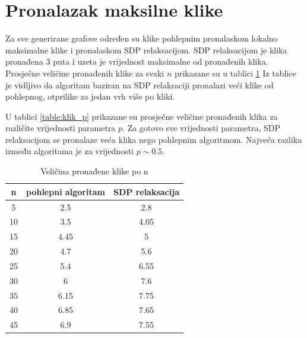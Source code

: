 \documentclass[diplomskirad]{fer}
\begin{document}
\section{Pronalazak maksilne klike}
Za sve generirane grafove određen su klike pohlepnim pronalaskom lokalno maksimalne klike i pronalaskom SDP relaksacijom. SDP relaksacijom je klika pronađena
3 puta i uzeta je vrijednost maksimalne od pronađenih klika. Prosječne veličine pronađenih klike za svaki $n$ prikazane su u tablici \ref{table:klik_n}
Iz tablice je vidljivo da algoritam baziran na SDP relaksaciji pronalazi veći klike od pohlepnog, otprilike za jedan vrh više po kliki.

U tablici \ref{table:klik_p} prikazane su prosječne veličine pronađenih klika za različite vrijednosti parametra $p$. Za gotovo sve vrijednosti
parametra, SDP relaksacijom se pronalaze veća klika nego pohlepnim algoritmom. Najveća razlika između algoritama je za vrijednosti $p \sim 0.5$.

\begin{table}
  \caption{Veličina pronađene klike po n}
  \label{table:klik_n}
  \centering
  \begin{tabular}{|c|c|c|}
    \hline
    n & pohlepni algoritam & SDP relaksacija \\
    \hline
    \hline
    5 & 2.5 & 2.8 \\
    \hline
    10 & 3.5 & 4.05 \\
    \hline
    15 & 4.45 & 5 \\
    \hline
    20 & 4.7 & 5.6 \\
    \hline
    25 & 5.4 & 6.55 \\
    \hline
    30 & 6 & 7.6 \\
    \hline
    35 & 6.15 & 7.75 \\
    \hline
    40 & 6.85 & 7.65 \\
    \hline
    45 & 6.9 & 7.55 \\
    \hline
  \end{tabular}
\end{table}
\end{document}

